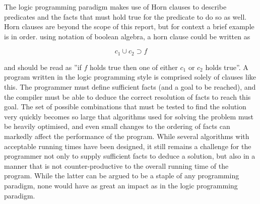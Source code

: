 The logic programming paradigm makes use of Horn clauses to describe predicates and the facts that must hold true for the predicate to do so as well. Horn clauses are beyond the scope of this report, but for context a brief example is in order. using notation of boolean algebra, a horn clause could be written as 

\[
c_1 \cup c_2 \supset f
\]

and should be read as ''if $f$ holds true then one of either $c_1$ or $c_2$ holds true''. A program written in the logic programming style is comprised solely of clauses like this. The programmer must define sufficient facts (and a goal to be reached), and the compiler must be able to deduce the correct resolution of facts to reach this goal. The set of possible combinations that must be tested to find the solution very quickly becomes so large that algorithms used for solving the problem must be heavily optimised, and even small changes to the ordering of facts can markedly affect the performance of the program. While several algorithms with acceptable running times have been designed, it still remains a challenge for the programmer not only to supply sufficient facts to deduce a solution, but also in a manner that is not counter-productive to the overall running time of the program. While the latter can be argued to be a staple of any programming paradigm, none would have as great an impact as in the logic programming paradigm.	